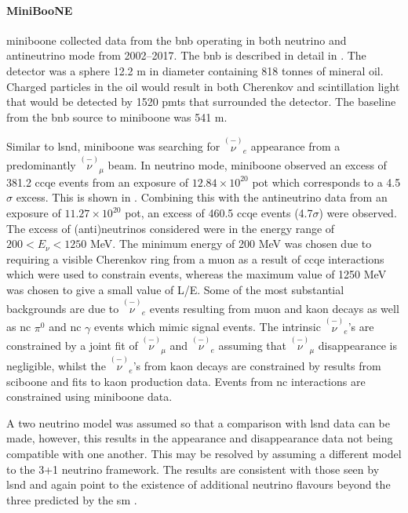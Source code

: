 \paragraph{MiniBooNE}
\gls{miniboone} collected data from the \gls{bnb} operating in both neutrino and antineutrino mode from 2002--2017. The \gls{bnb} is described in detail in . The detector was a sphere 12.2 m in diameter containing 818 tonnes of mineral oil. Charged particles in the oil would result in both Cherenkov and scintillation light that would be detected by 1520 \glspl{pmt} that surrounded the detector. The baseline from the \gls{bnb} source to \gls{miniboone} was 541 m.

Similar to \gls{lsnd}, \gls{miniboone} was searching for $\overset{(-)}{\nu}_{\!\!e}$ appearance from a predominantly $\overset{(-)}{\nu}_{\!\!\mu}$ beam. In neutrino mode, \gls{miniboone} observed an excess of 381.2 \gls{ccqe} events from an exposure of $12.84 \times 10^{20}$ \gls{pot} which corresponds to a 4.5$\sigma$ excess. This is shown in . Combining this with the antineutrino data from an exposure of $11.27 \times 10^{20}$ \gls{pot}, an excess of 460.5 \gls{ccqe} events (4.7$\sigma$) were observed. The excess of (anti)neutrinos considered were in the energy range of $200 < E_\nu < 1250$ MeV. The minimum energy of 200 MeV was chosen due to requiring a visible Cherenkov ring from a muon as a result of \numu \gls{ccqe} interactions which were used to constrain \nue events, whereas the maximum value of 1250 MeV was chosen to give a small value of L/E. Some of the most substantial backgrounds are due to $\overset{(-)}{\nu}_{\!\!e}$ events resulting from muon and kaon decays as well as \gls{nc} $\pi^0$ and \gls{nc} $\gamma$ events which mimic signal events. The intrinsic $\overset{(-)}{\nu}_{\!\!e}$'s are constrained by a joint fit of $\overset{(-)}{\nu}_{\!\!\mu}$ and $\overset{(-)}{\nu}_{\!\!e}$ assuming that $\overset{(-)}{\nu}_{\!\!\mu}$ disappearance is negligible, whilst the $\overset{(-)}{\nu}_{\!\!e}$'s from kaon decays are constrained by results from \gls{sciboone} and fits to kaon production data. Events from \gls{nc} interactions are constrained using \gls{miniboone} data. 

A two neutrino model was assumed so that a comparison with \gls{lsnd} data can be made, however, this results in the appearance and disappearance data not being compatible with one another. This may be resolved by assuming a different model to the 3+1 neutrino framework. The results are consistent with those seen by \gls{lsnd} and again point to the existence of additional neutrino flavours beyond the three predicted by the \gls{sm} \cite{MiniBooNE_excess}. 


